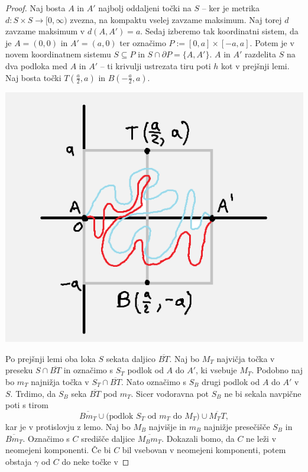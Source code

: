 \documentclass[10pt, a4paper]{article}
\newenvironment{noticeC}{%
  \tcolorbox[%
  notitle,
  empty,
  enhanced,  %
  breakable,
  coltext=black, 
  fontupper=\rmfamily,
  parbox=false,
  noparskip,
  sharp corners,
  boxrule=-1pt,  %
  frame hidden,
  left=7pt,  %
  right=7pt,
  top=5pt,
  bottom=5pt,
  before skip=2.5ex plus 2pt,
  after skip=2.5ex plus 2pt,
  overlay unbroken and last={%
  },
  ]}
{\endtcolorbox}
\newenvironment{dokaz}%
  {\begin{noticeC}\begin{proof}}%
  {\end{proof}\end{noticeC}}
\begin{document}
\begin{dokaz}
  Naj bosta $A$ in $A'$ najbolj oddaljeni točki na $S$ -- ker je metrika $d: S \times S \to [0, \infty)$
  zvezna, na kompaktu vselej zavzame maksimum. Naj torej $d$ zavzame maksimum v $d(A, A') = a$.
  Sedaj izberemo tak koordinatni sistem, da je $A = (0, 0)$ in $A' = (a, 0)$ ter označimo $P := [0, a] \times [-a, a]$.
  Potem je v novem koordinatnem sistemu $S \subseteq P$ in $S \cap \partial P = \{A, A'\}$.
  $A$ in $A'$ razdelita $S$ na dva podloka med $A$ in $A'$ -- ti krivulji ustrezata tiru poti $h$ kot v prejšnji lemi.
  Naj bosta točki $T\left(\frac{a}{2}, a\right)$ in $B\left(-\frac{a}{2}, a\right)$.
  \begin{center}
    \includegraphics[scale=0.8]{dokaz5.png}
  \end{center}
  Po prejšnji lemi oba loka $S$ sekata daljico $\overline{BT}$.
  Naj bo $M_T$ najvičja točka v preseku $S \cap \overline{BT}$ in označimo s $S_T$ podlok od $A$ do $A'$,
  ki vsebuje $M_T$. Podobno naj bo $m_T$ najnižja točka v $S_T \cap \overline{BT}$. Nato označimo 
  s $S_B$ drugi podlok od $A$ do $A'$ v $S$. Trdimo, da $S_B$ seka $\overline{BT}$ pod $m_T$.
  Sicer vodoravna pot $S_B$ ne bi sekala navpične poti s tirom 
  $$\overline{Bm_T} \cup \text{(podlok $S_T$ od $m_T$ do $M_T$)} \cup \overline{M_T T},$$
  kar je v protislovju z lemo. Naj bo $M_B$ najvišje in $m_B$ najnižje presečišče $S_B$ in $\overline{B m_T}$.
  Označimo s $C$ središče daljice $\overline{M_B m_T}$. Dokazali bomo, da $C$ ne leži v neomejeni komponenti.
  Če bi $C$ bil vsebovan v neomejeni komponenti, potem obstaja $\gamma$ od $C$ do neke točke v 

\end{dokaz}
\end{document}
